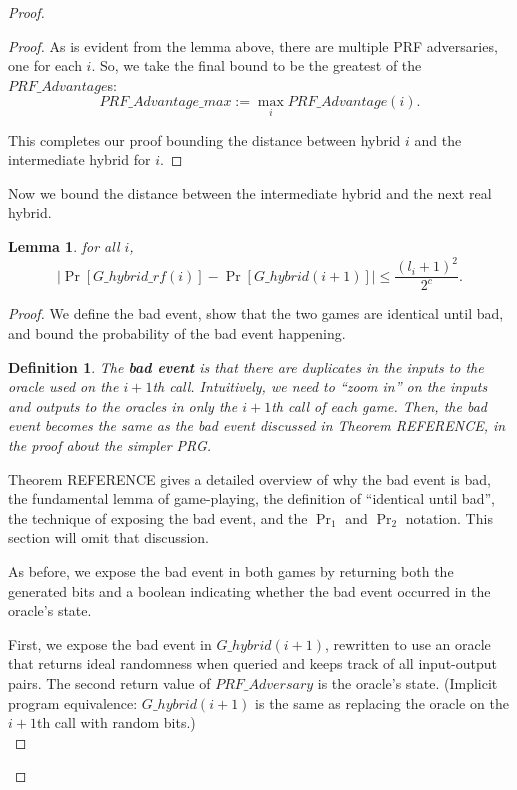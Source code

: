 \documentclass[12pt,lot, lof]{puthesis}
\newcommand{\f}{\frac}
\newtheorem{dfn}[thm]{Definition}
\newtheorem{lem}{Lemma}[thm]
\begin{document}
{\begin{proof}
\begin{proof}
As is evident from the lemma above, there are multiple PRF adversaries, one for each $i$. So, we take the final bound to be the greatest of the $PRF\_Advantage$s: 
$$PRF\_Advantage\_max := \max_i PRF\_Advantage(i).$$

This completes our proof bounding the distance between hybrid $i$ and the intermediate hybrid for $i$.
\end{proof}

Now we bound the distance between the intermediate hybrid and the next real hybrid.

\begin{lem} for all $i$,
$$|\Pr[G\_hybrid\_rf(i)] - \Pr[G\_hybrid(i+1)] | \leq \f{(l_i + 1)^2}{2^c}.$$ \end{lem}
\begin{proof} 

We define the bad event, show that the two games are identical until bad, and bound the probability of the bad event happening.

\begin{dfn}The \textbf{bad event} is that there are duplicates in the inputs to the oracle used on the $i+1$th call. 
Intuitively, we need to ``zoom in'' on the inputs and outputs to the oracles in only the $i+1$th call of each game. Then, the bad event becomes the same as the bad event discussed in Theorem REFERENCE, in the proof about the simpler PRG.
\end{dfn} 

Theorem REFERENCE gives a detailed overview of why the bad event is bad, the fundamental lemma of game-playing, the definition of ``identical until bad'', the technique of exposing the bad event, and the $\Pr_1$ and $\Pr_2$ notation. This section will omit that discussion.

As before, we expose the bad event in both games by returning both the generated bits and a boolean indicating whether the bad event occurred in the oracle's state.

First, we expose the bad event in $G\_hybrid(i+1)$, rewritten to use an oracle that returns ideal randomness when queried and keeps track of all input-output pairs. The second return value of $PRF\_Adversary$ is the oracle's state. (Implicit program equivalence: $G\_hybrid(i+1)$ is the same as replacing the oracle on the $i+1$th call with random bits.) \\


\end{proof}
\end{proof}}
\end{document}

